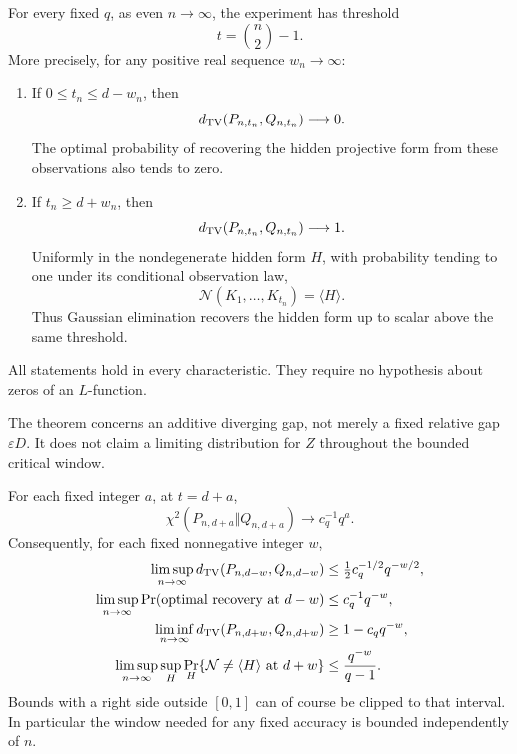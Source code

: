 \begin{theorem}\label{hidden:thm:threshold}
For every fixed $q$, as even $n\to\infty$, the experiment has threshold
\[
 t=\binom n2-1.
\]
More precisely, for any positive real sequence $w_n\to\infty$:
\begin{enumerate}
\item If $0\le t_n\le d-w_n$, then
\[
 d_{\rm TV}(P_{n,t_n},Q_{n,t_n})\longrightarrow0.
\]
The optimal probability of recovering the hidden projective form from
these observations also tends to zero.
\item If $t_n\ge d+w_n$, then
\[
 d_{\rm TV}(P_{n,t_n},Q_{n,t_n})\longrightarrow1.
\]
Uniformly in the nondegenerate hidden form $H$, with probability tending
to one under its conditional observation law,
\[
 \mathcal N(K_1,\ldots,K_{t_n})=\langle H\rangle.
\]
Thus Gaussian elimination recovers the hidden form up to scalar above
the same threshold.
\end{enumerate}
All statements hold in every characteristic. They require no hypothesis
about zeros of an $L$-function.
\end{theorem}

The theorem concerns an additive diverging gap, not merely a fixed
relative gap $\varepsilon D$. It does not claim a limiting distribution
for $Z$ throughout the bounded critical window.

\begin{theorem}\label{hidden:thm:window}
For each fixed integer $a$, at $t=d+a$,
\begin{equation}\label{hidden:eq:chi-limit}
 \chi^2(P_{n,d+a}\Vert Q_{n,d+a})\longrightarrow c_q^{-1}q^a.
\end{equation}
Consequently, for each fixed nonnegative integer $w$,
\begin{align}
 \limsup_{n\to\infty}d_{\rm TV}(P_{n,d-w},Q_{n,d-w})
 &\le\tfrac12c_q^{-1/2}q^{-w/2},\label{hidden:eq:below-TV}\\
 \limsup_{n\to\infty}\Pr(\text{optimal recovery at }d-w)
 &\le c_q^{-1}q^{-w},\label{hidden:eq:below-recovery}\\
 \liminf_{n\to\infty}d_{\rm TV}(P_{n,d+w},Q_{n,d+w})
 &\ge 1-c_q q^{-w},\label{hidden:eq:above-TV}\\
 \limsup_{n\to\infty}\sup_H
 \Pr_H\{\mathcal N\ne\langle H\rangle\text{ at }d+w\}
 &\le\frac{q^{-w}}{q-1}.\label{hidden:eq:above-recovery}
\end{align}
Bounds with a right side outside $[0,1]$ can of course be clipped to that
interval. In particular the window needed for any fixed accuracy is
bounded independently of $n$.
\end{theorem}

